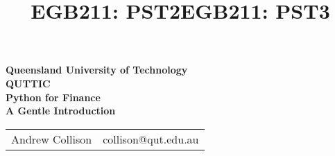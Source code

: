 \documentclass[11pt]{report}
\title{EGB211: PST2}
\begin{document}
\title{EGB211: PST3}
\begin{titlepage}
\begin{center}
\vspace{1cm}
\large{\textbf{Queensland University of Technology}}\\
\large{\textbf{QUTTIC}}\\
\vfill
\huge{\textbf{Python for Finance}}\\
\large{\textbf{A Gentle Introduction}}
\vfill
\begin{table}[h]
\centering
\begin{tabular}{cc}
Andrew Collison & collison@qut.edu.au        \\ 
\end{tabular}
\end{table}

\vspace{5mm}
\end{center}  
\end{titlepage}
\end{document}
